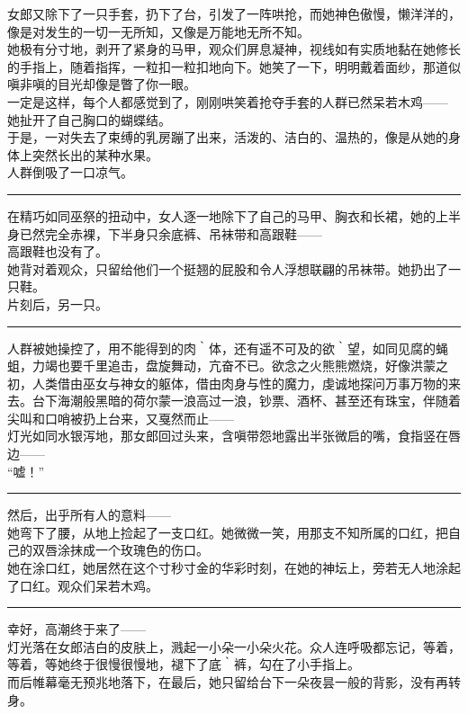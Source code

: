 \documentclass[oneside,11pt]{memoir} %
\begin{document}
\begin{CJK}{UTF8}{gbsn}
    女郎又除下了一只手套，扔下了台，引发了一阵哄抢，而她神色傲慢，懒洋洋的，像是对发生的一切一无所知，又像是万能地无所不知。\\\indent
    她极有分寸地，剥开了紧身的马甲，观众们屏息凝神，视线如有实质地黏在她修长的手指上，随着指挥，一粒扣一粒扣地向下。她笑了一下，明明戴着面纱，那道似嗔非嗔的目光却像是瞥了你一眼。\\\indent
    一定是这样，每个人都感觉到了，刚刚哄笑着抢夺手套的人群已然呆若木鸡——\\\indent
    她扯开了自己胸口的蝴蝶结。\\\indent
    于是，一对失去了束缚的乳房蹦了出来，活泼的、洁白的、温热的，像是从她的身体上突然长出的某种水果。\\\indent
    人群倒吸了一口凉气。\\\indent
\rule{-3pt}{30pt}
    在精巧如同巫祭的扭动中，女人逐一地除下了自己的马甲、胸衣和长裙，她的上半身已然完全赤裸，下半身只余底裤、吊袜带和高跟鞋——\\\indent
    高跟鞋也没有了。\\\indent
    她背对着观众，只留给他们一个挺翘的屁股和令人浮想联翩的吊袜带。她扔出了一只鞋。\\\indent
    片刻后，另一只。\\\indent
\rule{-3pt}{30pt}
    人群被她操控了，用不能得到的肉｀体，还有遥不可及的欲｀望，如同见腐的蝇蛆，力竭也要千里追击，盘旋舞动，亢奋不已。欲念之火熊熊燃烧，好像洪蒙之初，人类借由巫女与神女的躯体，借由肉身与性的魔力，虔诚地探问万事万物的来去。台下海潮般黑暗的荷尔蒙一浪高过一浪，钞票、酒杯、甚至还有珠宝，伴随着尖叫和口哨被扔上台来，又戛然而止——\\\indent
    灯光如同水银泻地，那女郎回过头来，含嗔带怨地露出半张微启的嘴，食指竖在唇边——\\\indent
    “嘘！”\\\indent
\rule{-3pt}{30pt}
    然后，出乎所有人的意料——\\\indent
    她弯下了腰，从地上捡起了一支口红。她微微一笑，用那支不知所属的口红，把自己的双唇涂抹成一个玫瑰色的伤口。\\\indent
    她在涂口红，她居然在这个寸秒寸金的华彩时刻，在她的神坛上，旁若无人地涂起了口红。观众们呆若木鸡。\\\indent
\rule{-3pt}{30pt}
    幸好，高潮终于来了——\\\indent
    灯光落在女郎洁白的皮肤上，溅起一小朵一小朵火花。众人连呼吸都忘记，等着，等着，等她终于很慢很慢地，褪下了底｀裤，勾在了小手指上。\\\indent
    而后帷幕毫无预兆地落下，在最后，她只留给台下一朵夜昙一般的背影，没有再转身。\\\indent

\end{CJK}
\end{document}
